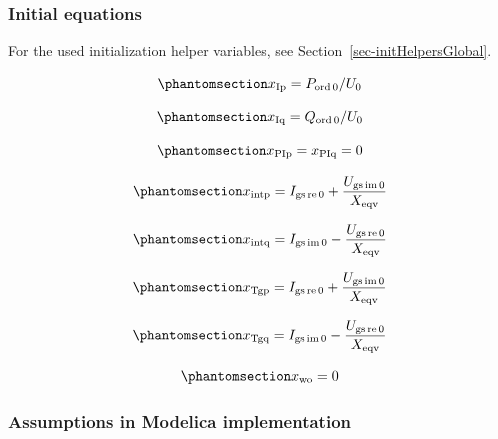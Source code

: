 \documentclass[
  a4paper,
  DIV=11,
  numbers=noendperiod]{scrartcl}
\begin{document}
\subsubsection{Initial equations}\label{initial-equations-4}

For the used initialization helper variables, see
Section~\ref{sec-initHelpersGlobal}.

\begin{equation}\phantomsection\label{eq-initXip}{ 
x_\mathrm{Ip} = P_\mathrm{ord\,0}/U_0
}\end{equation}

\begin{equation}\phantomsection\label{eq-initXiq}{ 
x_\mathrm{Iq} = Q_\mathrm{ord\,0}/U_0
}\end{equation}

\begin{equation}\phantomsection\label{eq-initXpip}{ 
x_\mathrm{PIp} = x_\mathrm{PIq} = 0
}\end{equation}

\begin{equation}\phantomsection\label{eq-initXintp}{ 
x_\mathrm{intp} = I_\mathrm{gs\,re\,0} + \frac{U_\mathrm{gs\,im\,0}}{X_\mathrm{eqv}}
}\end{equation}

\begin{equation}\phantomsection\label{eq-initXintq}{ 
x_\mathrm{intq} = I_\mathrm{gs\,im\,0} - \frac{U_\mathrm{gs\,re\,0}}{X_\mathrm{eqv}}
}\end{equation}

\begin{equation}\phantomsection\label{eq-initXtgp}{ 
x_\mathrm{Tgp} = I_\mathrm{gs\,re\,0} + \frac{U_\mathrm{gs\,im\,0}}{X_\mathrm{eqv}}
}\end{equation}

\begin{equation}\phantomsection\label{eq-initXtgq}{ 
x_\mathrm{Tgq} = I_\mathrm{gs\,im\,0} - \frac{U_\mathrm{gs\,re\,0}}{X_\mathrm{eqv}}
}\end{equation}

\begin{equation}\phantomsection\label{eq-initXwo}{ 
x_\mathrm{wo} = 0
}\end{equation}

\subsubsection{Assumptions in Modelica
implementation}\label{assumptions-in-modelica-implementation}
\end{document}
